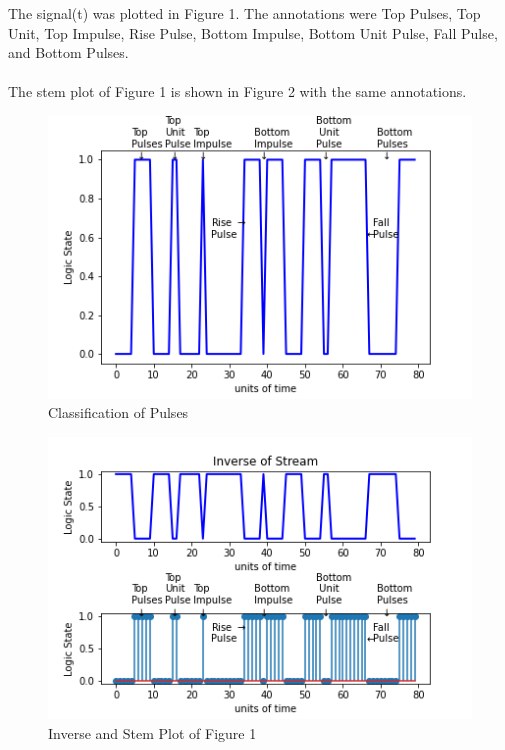 \documentclass[10pt,journal]{IEEEtran}
\begin{document}
The signal(t) was plotted in Figure 1. The annotations were Top Pulses,    Top Unit, Top Impulse, Rise Pulse, Bottom Impulse, Bottom Unit Pulse,    Fall Pulse, and Bottom Pulses.    \\ \ \\    The stem plot of Figure 1 is shown in Figure 2 with the same annotations. 
\begin{figure}[H]
\centering\includegraphics[width=1\linewidth,height=0.15\textheight]{FG001.png}
\caption{Classification of Pulses}
\label{fig:FG001.png}
\end{figure}

\begin{figure}[H]
\centering\includegraphics[width=1\linewidth,height=0.15\textheight]{FG002.png}
\caption{Inverse and Stem Plot of Figure 1}
\label{fig:FG002.png}
\end{figure}
\end{document}

